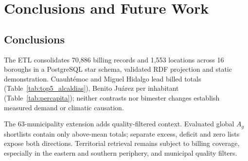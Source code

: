 \documentclass[runningheads]{llncs}
\newenvironment{nuevobloque}{}{}
\renewcommand{\_}{\origunderscore\allowbreak}
\begin{document}
\section{Conclusions and Future Work}
\label{sec:con}

\subsection{Conclusions}

\begin{nuevobloque}
The ETL consolidates 70,886 billing records and 1,553 locations across 16 boroughs in a
PostgreSQL star schema, validated RDF projection and static demonstration. Cuauht\'emoc
and Miguel Hidalgo lead billed totals (Table~\ref{tab:top5_alcaldias}), Benito Ju\'arez
per inhabitant (Table~\ref{tab:percapita}); neither contrasts nor bimester changes
establish measured demand or climatic causation.

The 63-municipality extension adds quality-filtered context. Evaluated global $A_g$
shortlists contain only above-mean totals; separate excess, deficit and zero lists
expose both directions. Territorial retrieval remains subject to billing coverage,
especially in the eastern and southern periphery, and municipal quality filters.
\end{nuevobloque}
\end{document}
